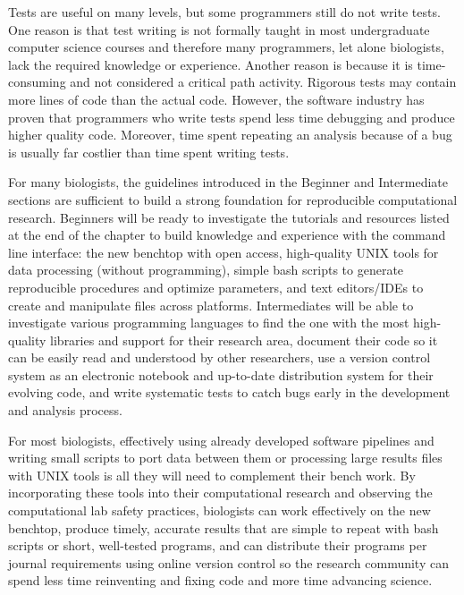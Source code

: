 \documentclass[ChapterTOCs,krantz2]{krantz} %
\begin{document}
Tests are useful on many levels, but some programmers still do not
write tests\cite{Wilson2006}.  One reason is that test writing is not formally taught in most
undergraduate computer science courses and therefore many programmers, let
alone biologists, lack the required knowledge or experience.  Another reason is
because it is time-consuming and not considered a critical path activity\cite{Segal2007,Kelly2008}.
Rigorous tests may contain more lines of code than the actual code. 
However, the software industry has proven that 
programmers who write tests 
spend less time debugging and produce higher quality code.
Moreover, time spent repeating an analysis because of a bug is usually far
costlier than time spent writing tests.

For many biologists, the guidelines introduced in the Beginner and Intermediate
sections are sufficient to build a strong foundation for reproducible
computational research.  Beginners will be ready to investigate the tutorials
and resources listed at the end of the chapter to build knowledge and
experience with the command line interface: the new benchtop with open access,
high-quality UNIX tools for data processing (without programming), simple bash
scripts to generate reproducible procedures and optimize parameters, and text
editors/IDEs to create and manipulate files across platforms.  Intermediates
will be able to investigate various programming languages to find the one with
the most high-quality libraries and support for their research area, document
their code so it can be easily read and understood by other researchers, use a
version control system as an electronic notebook and up-to-date distribution
system for their evolving code, and write systematic tests to catch bugs early
in the development and analysis process. 

For most biologists, effectively using already developed software pipelines and writing
small scripts to port data between them or processing large results files with
UNIX tools is all they will need to complement their bench work.  By
incorporating these tools into their computational research and observing the
computational lab safety practices, biologists can work
effectively on the new benchtop, produce timely, accurate results that are
simple to repeat with bash scripts or short, well-tested programs, and can
distribute their programs per journal requirements using online version control
so the research community can spend less time reinventing and fixing code and
more time advancing science. 
\end{document}

